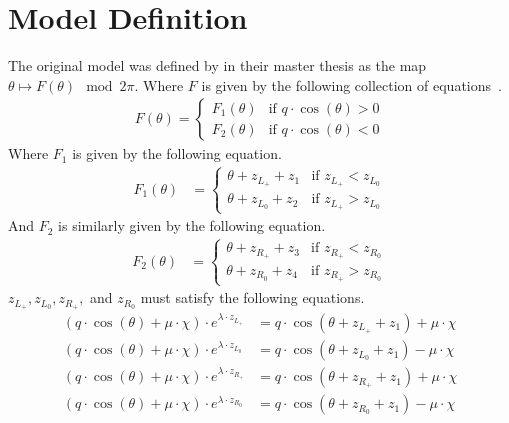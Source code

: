 \section{Model Definition}
\label{sec:og.def}

The original model was defined by  in their master thesis as the map $\theta \mapsto F(\theta) \mod 2 \pi$.
Where $F$ is given by the following collection of equations~\cite{akyuz2022}.
\begin{align}
    F(\theta) = \begin{cases}
                    F_1(\theta) & \text{if } q \cdot \cos(\theta) > 0 \\
                    F_2(\theta) & \text{if } q \cdot \cos(\theta) < 0
                \end{cases}
\end{align}
Where $F_1$ is given by the following equation.
\begin{align}
    F_1(\theta) & = \begin{cases}
                        \theta + z_{L_+} + z_1 & \text{if } z_{L_+} < z_{L_0} \\
                        \theta + z_{L_0} + z_2 & \text{if } z_{L_+} > z_{L_0}
                    \end{cases}
\end{align}
And $F_2$ is similarly given by the following equation.
\begin{align}
    F_2(\theta) & = \begin{cases}
                        \theta + z_{R_+} + z_3 & \text{if } z_{R_+} < z_{R_0} \\
                        \theta + z_{R_0} + z_4 & \text{if } z_{R_+} > z_{R_0}
                    \end{cases}
\end{align}
$z_{L_+}, z_{L_0}, z_{R_+},$ and $z_{R_0}$ must satisfy the following equations.
\begin{subequations}
    \begin{align}
        (q \cdot \cos(\theta) + \mu \cdot \chi) \cdot e^{\lambda \cdot z_{L_+}}
         & = q \cdot \cos(\theta + z_{L_+} + z_1) + \mu \cdot \chi \\
        (q \cdot \cos(\theta) + \mu \cdot \chi) \cdot e^{\lambda \cdot z_{L_0}}
         & = q \cdot \cos(\theta + z_{L_0} + z_1) - \mu \cdot \chi \\
        (q \cdot \cos(\theta) + \mu \cdot \chi) \cdot e^{\lambda \cdot z_{R_+}}
         & = q \cdot \cos(\theta + z_{R_+} + z_1) + \mu \cdot \chi \\
        (q \cdot \cos(\theta) + \mu \cdot \chi) \cdot e^{\lambda \cdot z_{R_0}}
         & = q \cdot \cos(\theta + z_{R_0} + z_1) - \mu \cdot \chi
    \end{align}
\end{subequations}
